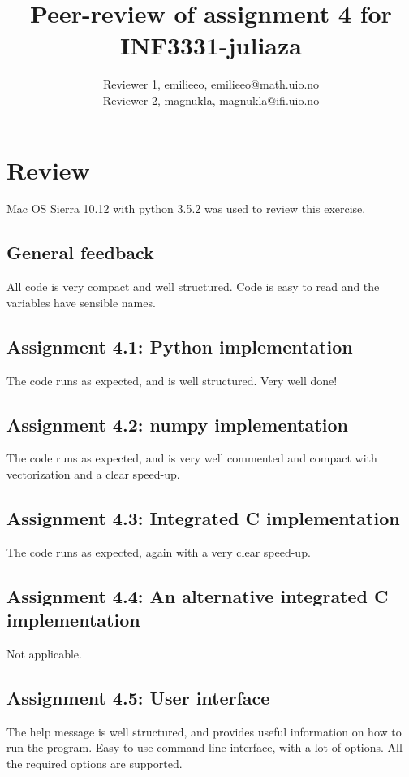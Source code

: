 \documentclass[a4paper]{article}
\title{Peer-review of assignment 4 for INF3331-juliaza}
\author{Reviewer 1, emilieeo, {emilieeo@math.uio.no} \\
 		Reviewer 2, magnukla, {magnukla@ifi.uio.no}}
\begin{document}
\maketitle


\section*{Review}
Mac OS Sierra 10.12 with python 3.5.2 was used to review this exercise. 
\subsection*{General feedback}
All code is very compact and well structured. Code is easy to read and the variables have sensible names. 

\subsection*{Assignment 4.1: Python implementation}
The code runs as expected, and is well structured. Very well done!



\subsection*{Assignment 4.2:  numpy implementation} \label{sec:assignment5.2}
The code runs as expected, and is very well commented and compact with vectorization and a clear speed-up. 


\subsection*{Assignment 4.3: Integrated C implementation}
The code runs as expected, again with a very clear speed-up. 


\subsection*{Assignment 4.4:  An alternative integrated C implementation}
Not applicable. 


\subsection*{Assignment 4.5: User interface}
The help message is well structured, and provides useful information on how to run the program. Easy to use command line interface, with a lot of options. All the required options are supported. 
\end{document}
